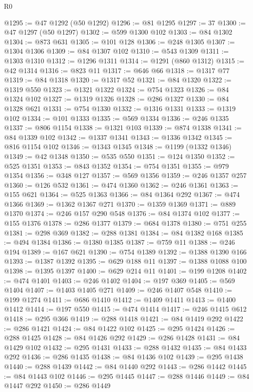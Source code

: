 \begin{lexlean}{R0}
\begin{coremodule}
@1295 := @47 @1292 (@50 @1292)
@1296 := @81 @1295
@1297 := 37
@1300 := @47 @1297 (@50 @1297)
@1302 := @599 @1300 @102
@1303 := @84 @1302
@1304 := @873 @631
@1305 := @101 @128
@1306 := @248 @1305
@1307 := @1304 @1306
@1309 := @84 @1307 @102
@1310 := @543 @1309
@1311 := @1303 @1310
@1312 := @1296 @1311
@1314 := @1291 (@860 @1312)
@1315 := @42 @1314
@1316 := @823 @11
@1317 := @646 @66
@1318 := @1317 @77
@1319 := @84 @1318
@1320 := @1317 @52
@1321 := @84 @1320
@1322 := @1319 @550
@1323 := @1321 @1322
@1324 := @754 @1323
@1326 := @84 @1324 @102
@1327 := @1319 @1326
@1328 := @286 @1327
@1330 := @84 @1328 @621
@1331 := @754 @1330
@1332 := @1316 @1331
@1333 := @1319 @102
@1334 := @101 @1333
@1335 := @569 @1334
@1336 := @246 @1335
@1337 := @806 @1154
@1338 := @1321 @103
@1339 := @874 @1338
@1341 := @84 @1339 @102
@1342 := @1337 @1341
@1343 := @1336 @1342
@1345 := @816 @1154 @102
@1346 := @1343 @1345
@1348 := @1199 (@1332 @1346)
@1349 := @42 @1348
@1350 := @535 @550
@1351 := @124 @1350
@1352 := @525 @1351
@1353 := @843 @1352
@1354 := @754 @1351
@1355 := @979 @1354
@1356 := @348 @127
@1357 := @569 @1356
@1359 := @246 @1357 @257
@1360 := @126 @532
@1361 := @474 @1360
@1362 := @246 @1361
@1363 := @155 @621
@1364 := @525 @1363
@1366 := @84 @1364 @292
@1367 := @474 @1366
@1369 := @1362 @1367 @271
@1370 := @1359 @1369
@1371 := @889 @1370
@1374 := @246 @157 @290 @548
@1376 := @84 @1374 @102
@1377 := @155 @1376
@1378 := @286 @1377
@1379 := @684 @1378
@1380 := @751 @255
@1381 := @298 @369
@1382 := @288 @1381
@1384 := @84 @1382 @168
@1385 := @494 @1384
@1386 := @1380 @1385
@1387 := @759 @11
@1388 := @246 @194
@1389 := @167 @621
@1390 := @754 @1389
@1392 := @1388 @1390 @166
@1393 := @1387 @1392
@1395 := @629 @188 @11
@1397 := @1388 @1088 @100
@1398 := @1395 @1397
@1400 := @629 @214 @11
@1401 := @199 @1208
@1402 := @474 @1401
@1403 := @246 @1402
@1404 := @197 @369
@1405 := @569 @1404
@1407 := @1403 @1405 @271
@1409 := @246 @1407 @548
@1410 := @199 @1274
@1411 := @686 @1410
@1412 := @1409 @1411
@1413 := @1400 @1412
@1414 := @197 @550
@1415 := @474 @1414
@1417 := @246 @1415 @612
@1418 := @295 @366
@1419 := @288 @1418
@1421 := @84 @1419 @292
@1422 := @286 @1421
@1424 := @84 @1422 @102
@1425 := @295 @1424
@1426 := @288 @1425
@1428 := @84 @1426 @292
@1429 := @286 @1428
@1431 := @84 @1429 @102
@1432 := @295 @1431
@1433 := @288 @1432
@1435 := @84 @1433 @292
@1436 := @286 @1435
@1438 := @84 @1436 @102
@1439 := @295 @1438
@1440 := @288 @1439
@1442 := @84 @1440 @292
@1443 := @286 @1442
@1445 := @84 @1443 @102
@1446 := @295 @1445
@1447 := @288 @1446
@1449 := @84 @1447 @292
@1450 := @286 @1449

\end{coremodule}
\end{lexlean}
